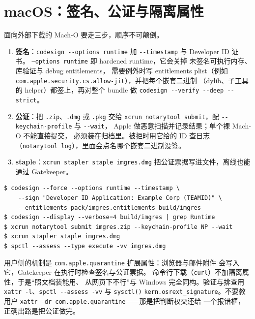 \documentclass[12pt,a4paper,fontset=fandol]{ctexbook}
\newcommand{\Fn}[1]{\texttt{#1()}}
\newcommand{\Tp}[1]{\texttt{#1}}
\begin{document}
\section{macOS：签名、公证与隔离属性}

面向外部下载的 Mach-O 要走三步，顺序不可颠倒。

\begin{enumerate}
\item \textbf{签名}：\lstinline|codesign --options runtime| 加
      \lstinline|--timestamp| 与 Developer ID 证书。
      \Tp{--options runtime} 即 hardened runtime，它会关掉
      未签名可执行内存、库验证与 debug entitlements，
      需要例外时写 entitlements plist（例如
      \Tp{com.apple.security.cs.allow-jit}），并把每个嵌套二进制
      （dylib、子工具的 helper）都签上，再对整个 bundle 做
      \lstinline|codesign --verify --deep --strict|。
\item \textbf{公证}：把 \Tp{.zip}、\Tp{.dmg} 或 \Tp{.pkg} 交给
      \lstinline|xcrun notarytool submit|，配
      \lstinline|--keychain-profile| 与 \lstinline|--wait|，
      Apple 做恶意扫描并记录结果；单个裸 Mach-O 不能直接提交，
      必须装在归档里。被拒时用它给的 ID 查日志
      （\lstinline|notarytool log|），里面会点名哪个嵌套二进制没签。
\item \textbf{staple}：\lstinline|xcrun stapler staple imgres.dmg|
      把公证票据写进文件，离线也能通过 Gatekeeper。
\end{enumerate}

\begin{lstlisting}[style=shellstyle,caption={macOS 侧一条典型的发布命令串}]
$ codesign --force --options runtime --timestamp \
    --sign "Developer ID Application: Example Corp (TEAMID)" \
    --entitlements pack/imgres.entitlements build/imgres
$ codesign --display --verbose=4 build/imgres | grep Runtime
$ xcrun notarytool submit imgres.zip --keychain-profile NP --wait
$ xcrun stapler staple imgres.dmg
$ spctl --assess --type execute -vv imgres.dmg
\end{lstlisting}

用户侧的机制是 \Tp{com.apple.quarantine} 扩展属性：浏览器与邮件附件
会写入它，Gatekeeper 在执行时检查签名与公证票据。
命令行下载（\lstinline|curl|）不加隔离属性，于是``照文档装能用、
从网页下不行''与 Windows 完全同构。验证与排查用
\lstinline|xattr -l|、\lstinline|spctl --assess -vv| 与 \Fn{sysctl}
\lstinline|kern.osrext_signature|。不要教用户
\lstinline|xattr -dr com.apple.quarantine|——那是把判断权交还给
一个报错框，正确出路是把公证做完。
\end{document}
